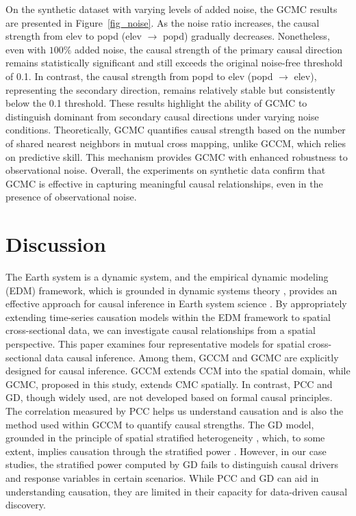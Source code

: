 \documentclass[authoryear,preprint,review,12pt]{elsarticle}
\begin{document}
On the synthetic dataset with varying levels of added noise, the GCMC results are presented in Figure~\ref{fig_noise}. As the noise ratio increases, the causal strength from elev to popd (elev \(\rightarrow\) popd) gradually decreases. Nonetheless, even with $100\%$ added noise, the causal strength of the primary causal direction remains statistically significant and still exceeds the original noise-free threshold of 0.1. In contrast, the causal strength from popd to elev (popd \(\rightarrow\) elev), representing the secondary direction, remains relatively stable but consistently below the 0.1 threshold. These results highlight the ability of GCMC to distinguish dominant from secondary causal directions under varying noise conditions. Theoretically, GCMC quantifies causal strength based on the number of shared nearest neighbors in mutual cross mapping, unlike GCCM, which relies on predictive skill. This mechanism provides GCMC with enhanced robustness to observational noise. Overall, the experiments on synthetic data confirm that GCMC is effective in capturing meaningful causal relationships, even in the presence of observational noise.

\section{Discussion}\label{sec4} 

The Earth system is a dynamic system, and the empirical dynamic modeling (EDM) framework, which is grounded in dynamic systems theory \citep{ma2017cme,leng2020pcm,tao2023cmc}, provides an effective approach for causal inference in Earth system science \citep{gao2023gccm}. By appropriately extending time-series causation models within the EDM framework to spatial cross-sectional data, we can investigate causal relationships from a spatial perspective. This paper examines four representative models for spatial cross-sectional data causal inference. Among them, GCCM and GCMC are explicitly designed for causal inference. GCCM extends CCM into the spatial domain, while GCMC, proposed in this study, extends CMC spatially. In contrast, PCC and GD, though widely used, are not developed based on formal causal principles. The correlation measured by PCC helps us understand causation and is also the method used within GCCM to quantify causal strengths. The GD model, grounded in the principle of spatial stratified heterogeneity \citep{wang2010gd1,wang2016gd2,lyu2025gdverse}, which, to some extent, implies causation through the stratified power \citep{wang2024gd3}. However, in our case studies, the stratified power computed by GD fails to distinguish causal drivers and response variables in certain scenarios. While PCC and GD can aid in understanding causation, they are limited in their capacity for data-driven causal discovery.
\end{document}
